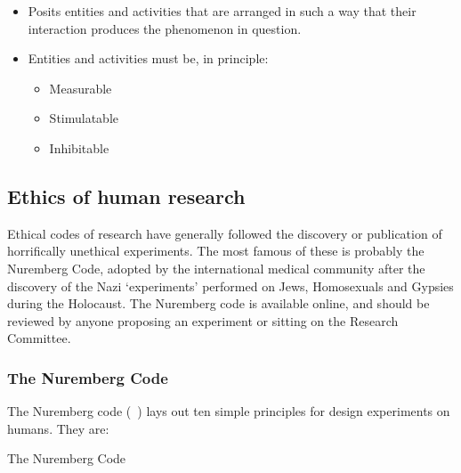 \begin{refsection}
\begin{itemize}
\item Posits entities and activities that are arranged in such a way that their interaction produces the phenomenon in question.

\item Entities and activities must be, in principle:

\begin{itemize}
\item Measurable

\item Stimulatable

\item Inhibitable

\end{itemize}

\end{itemize}

\subsection{Ethics of human research}
\label{ethicsofhumanresearch}

Ethical codes of research have generally followed the discovery or publication of horrifically unethical experiments. The most famous of these is probably the Nuremberg Code, adopted by the international medical community after the discovery of the Nazi `experiments' performed on Jews, Homosexuals and Gypsies during the Holocaust. The Nuremberg code is available online, and should be reviewed by anyone proposing an experiment or sitting on the Research Committee. 

\subsubsection{The Nuremberg Code}
\label{thenurembergcode}

The Nuremberg code (~\citep{TheNationalInstitutesofHeath:2009vr}) lays out ten simple principles for design experiments on humans. They are:

\begin{apatextbox}{The Nuremberg Code} 

\end{apatextbox}
\end{refsection}
